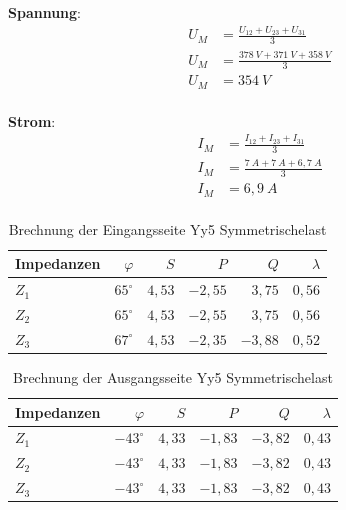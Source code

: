 \begin{enumerate}[label=\alph*)]
\begin{tcolorbox}[colback=gray!30,
			      colframe=black,
			      width=0.9\textwidth,
		      ]
{			      \begin{minipage}{0.5\textwidth}
				      \textbf{Spannung}:
				      \begin{align*}
					      U_M & = \frac{U_{12} + U_{23} + U_{31}}{3} \\
					      U_M & = \frac{378\ V + 371\ V + 358\ V}{3} \\
					      U_M & = 354\ V                             \\
				      \end{align*}
			      \end{minipage}\hfill
			      \begin{minipage}{0.5\textwidth}
				      \textbf{Strom}:
				      \begin{align*}
					      I_M & = \frac{I_{12} + I_{23} + I_{31}}{3} \\
					      I_M & = \frac{7\ A + 7\ A + 6,7\ A}{3}     \\
					      I_M & = 6,9\ A                             \\
				      \end{align*}
			      \end{minipage}
		      }
	      \end{tcolorbox}
	      \begin{table}[h!]
		      \caption{Brechnung der Eingangsseite Yy5 Symmetrischelast}
		      \centering
		      \begin{tabular}{lrrrrr}
			      \hline
			      Impedanzen & $\varphi$    & $S$    & $P$      & $Q$      & $\lambda$ \\ \hline
			      $Z_1$      & $65^\circ$   & $4,53$ & $-2,55$  & $ 3,75 $ & $0,56$    \\
			      $Z_2$      & $65^\circ$   & $4,53$ & $-2,55 $ & $ 3,75$  & $0,56$    \\
			      $Z_3$      & $67^\circ  $ & $4,53$ & $-2,35$  & $ -3,88$ & $0,52$    \\ \hline
		      \end{tabular}
	      \end{table}
	      \begin{table}[h!]
		      \caption{Brechnung der Ausgangsseite Yy5 Symmetrischelast}
		      \centering
		      \begin{tabular}{lrrrrr}
			      \hline
			      Impedanzen & $\varphi$     & $S$    & $P$      & $Q$     & $\lambda$ \\ \hline
			      $Z_1$      & $-43^\circ$   & $4,33$ & $-1,83$  & $-3,82$ & $0,43$    \\
			      $Z_2$      & $-43^\circ$   & $4,33$ & $-1,83 $ & $-3,82$ & $0,43$    \\
			      $Z_3$      & $-43^\circ  $ & $4,33$ & $-1,83$  & $-3,82$ & $0,43$    \\ \hline
		      \end{tabular}
	      \end{table}


\end{enumerate}
